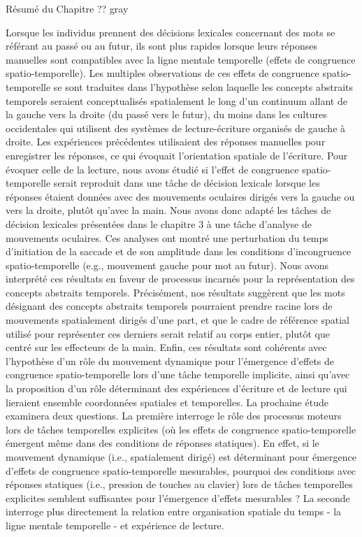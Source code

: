\documentclass[
  a4paper,12pt,twoside,onecolumn,openright,final,oldfontcommands]{memoir}
\newcommand\chaptercolor{gray}
\newcommand\getcurrentref[1]{
 \ifnumequal{\value{#1}}{0}
  {??}
  {\the\value{#1}}
}
\begin{document}
\begin{vplace}[1]

\begin{summary}{Résumé du Chapitre\getcurrentref{chapter}}{\chaptercolor}

Lorsque les individus prennent des décisions lexicales concernant des mots se référant au passé ou au futur, ils sont plus rapides lorsque leurs réponses manuelles sont compatibles avec la ligne mentale temporelle (effets de congruence spatio-temporelle). Les multiples observations de ces effets de congruence spatio-temporelle se sont traduites dans l’hypothèse selon laquelle les concepts abstraits temporels seraient conceptualisés spatialement le long d’un continuum allant de la gauche vers la droite (du passé vers le futur), du moins dans les cultures occidentales qui utilisent des systèmes de lecture-écriture organisés de gauche à droite. Les expériences précédentes utilisaient des réponses manuelles pour enregistrer les réponses, ce qui évoquait l’orientation spatiale de l'écriture. Pour évoquer celle de la lecture, nous avons étudié si l'effet de congruence spatio-temporelle serait reproduit dans une tâche de décision lexicale lorsque les réponses étaient données avec des mouvements oculaires dirigés vers la gauche ou vers la droite, plutôt qu’avec la main. Nous avons donc adapté les tâches de décision lexicales présentées dans le chapitre 3 à une tâche d’analyse de mouvements oculaires. Ces analyses ont montré une perturbation du temps d’initiation de la saccade et de son amplitude dans les conditions d’incongruence spatio-temporelle (e.g., mouvement gauche pour mot au futur). Nous avons interprété ces résultats en faveur de processus incarnés pour la représentation des concepts abstraits temporels. Précisément, nos résultats suggèrent que les mots désignant des concepts abstraits temporels pourraient prendre racine lors de mouvements spatialement dirigés d’une part, et que le cadre de référence spatial utilisé pour représenter ces derniers serait relatif au corps entier, plutôt que centré sur les effecteurs de la main. Enfin, ces résultats sont cohérents avec l'hypothèse d'un rôle du mouvement dynamique pour l'émergence d'effets de congruence spatio-temporelle lors d'une tâche temporelle implicite, ainsi qu'avec la proposition d’un rôle déterminant des expériences d’écriture et de lecture qui lieraient ensemble coordonnées spatiales et temporelles. La prochaine étude examinera deux questions. La première interroge le rôle des processus moteurs lors de tâches temporelles explicites (où les effets de congruence spatio-temporelle émergent même dans des conditions de réponses statiques). En effet, si le mouvement dynamique (i.e., spatialement dirigé) est déterminant pour émergence d’effets de congruence spatio-temporelle mesurables, pourquoi des conditions avec réponses statiques (i.e., pression de touches au clavier) lors de tâches temporelles explicites semblent suffisantes pour l’émergence d’effets mesurables ? La seconde interroge plus directement la relation entre organisation spatiale du temps - la ligne mentale temporelle - et expérience de lecture.  

\end{summary}

\end{vplace}
\end{document}

